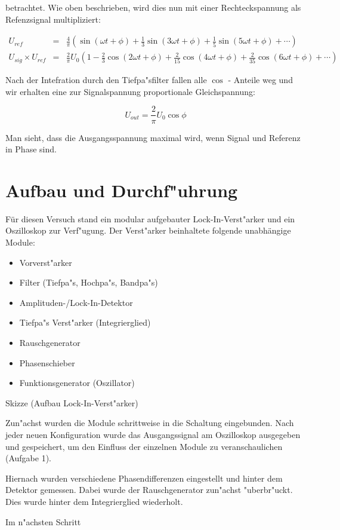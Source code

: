 \documentclass{scrartcl}
\begin{document}
	betrachtet. Wie oben beschrieben,
	wird dies nun mit einer Rechteckspannung als Refenzsignal multipliziert:

	\begin{eqnarray*}
		U_{ref} &=& \frac{4}{\pi}
			\left( \sin(\omega t + \phi) + 
				\frac{1}{3} \sin(3 \omega t + \phi) + 
				\frac{1}{5} \sin(5 \omega t + \phi) + 
				\cdots 
			\right)	\\
		U_{sig} \times U_{ref} &=& \frac{2}{\pi} U_0 
		\left(
			1 - 
			\frac{2}{3}\cos(2 \omega t + \phi) + 
			\frac{2}{15} \cos(4 \omega t + \phi) + 
			\frac{2}{35} \cos(6 \omega t + \phi) + 
			\cdots 
		\right)
	\end{eqnarray*}

	Nach der Intefration durch den Tiefpa"sfilter fallen alle $\cos$ - Anteile weg und wir erhalten eine zur Signalspannung proportionale Gleichspannung:

	\begin{equation}
		U_{out} = \frac{2}{\pi} U_0 \cos{\phi}
	\end{equation}

	Man sieht, dass die Ausgangsspannung maximal wird, wenn Signal und Referenz in Phase sind.

	\section{Aufbau und Durchf"uhrung}

	Für diesen Versuch stand ein modular aufgebauter Lock-In-Verst"arker und ein Oszilloskop zur Verf"ugung.
	Der Verst"arker beinhaltete folgende unabhängige Module:

	\begin{itemize}
		\item Vorverst"arker
		\item Filter (Tiefpa"s, Hochpa"s, Bandpa"s)
		\item Amplituden-/Lock-In-Detektor
		\item Tiefpa"s Verst"arker (Integrierglied)
		\item Rauschgenerator
		\item Phasenschieber
		\item Funktionsgenerator (Oszillator)
	\end{itemize}
	Skizze (Aufbau Lock-In-Verst"arker)


	Zun"achst wurden die Module schrittweise in die Schaltung eingebunden.
	Nach jeder neuen Konfiguration wurde das Ausgangssignal am Oszilloskop ausgegeben und gespeichert,
	um den Einfluss der einzelnen Module zu veranschaulichen (Aufgabe 1).

	Hiernach wurden verschiedene Phasendifferenzen eingestellt und hinter dem Detektor gemessen.
	Dabei wurde der Rauschgenerator zun"achst "uberbr"uckt.
	Dies wurde hinter dem Integrierglied wiederholt.

	Im n"achsten Schritt 
\end{document}
